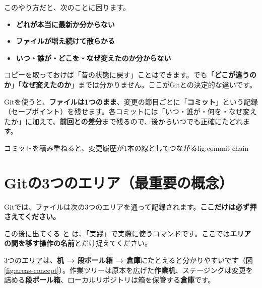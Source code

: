 このやり方だと、次のことに困ります。

\begin{itemize}[leftmargin=1.4em]
  \item \textbf{どれが本当に最新か分からない}
  \item \textbf{ファイルが増え続けて散らかる}
  \item \textbf{いつ・誰が・どこを・なぜ変えたのか分からない}
\end{itemize}

コピーを取っておけば「昔の状態に戻す」ことはできます。でも「\textbf{どこが違うのか}」「\textbf{なぜ変えたのか}」までは分かりません。ここがGitとの決定的な違いです。

Gitを使うと、\textbf{ファイルは1つのまま}、変更の節目ごとに「\textbf{コミット}」という記録（セーブポイント）を残せます。各コミットには「いつ・誰が・何を・なぜ変えたか」に加えて、\textbf{前回との差分}まで残るので、後からいつでも正確にたどれます。

\begin{numfig}{コミットを積み重ねると、変更履歴が1本の線としてつながる}{fig:commit-chain}
\end{numfig}

\section{Gitの3つのエリア（最重要の概念）}

Gitでは、ファイルは次の3つのエリアを通って記録されます。\textbf{ここだけは必ず押さえてください。}

この後に出てくる  と  は、「実践」で実際に使うコマンドです。ここでは\textbf{エリアの間を移す操作の名前}とだけ捉えてください。

3つのエリアは、\textbf{机 → 段ボール箱 → 倉庫}にたとえると分かりやすいです（図\ref{fig:areas-concept}）。作業ツリーは原本を広げた\textbf{作業机}、ステージングは変更を詰める\textbf{段ボール箱}、ローカルリポジトリは箱を保管する\textbf{倉庫}です。

